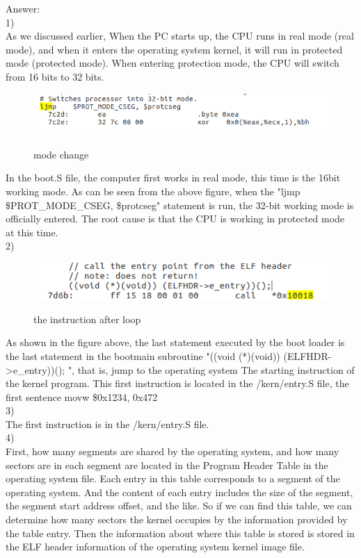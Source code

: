 \begin{flushleft}
{\Large Answer:}\\
1)\\
\qquad As we discussed earlier, When the PC starts up, the CPU runs in real mode (real mode), and when it enters the operating system kernel, it will run in protected mode (protected mode). When entering protection mode, the CPU will switch from 16 bits to 32 bits.
\begin{figure}[H]
  \centering
  \includegraphics[width=0.8\linewidth]{figure/mode_change}\\
  \caption{mode change}\label{2}
\end{figure}
\qquad In the boot.S file, the computer first works in real mode, this time is the 16bit working mode. As can be seen from the above figure, when the "ljmp \$PROT\_MODE\_CSEG, \$protcseg" statement is run, the 32-bit working mode is officially entered. The root cause is that the CPU is working in protected mode at this time.\\
2)\\
\begin{figure}[H]
  \centering
  \includegraphics[width=0.8\linewidth]{figure/7d6b}\\
  \caption{the instruction after loop}\label{2}
\end{figure}
\qquad As shown in the figure above, the last statement executed by the boot loader is the last statement in the bootmain subroutine "((void (*)(void)) (ELFHDR->e\_entry))(); ", that is, jump to the operating system The starting instruction of the kernel program.
This first instruction is located in the /kern/entry.S file, the first sentence movw \$0x1234, 0x472\\
3)\\
\qquad The first instruction is in the /kern/entry.S file.\\
4)\\
\qquad First, how many segments are shared by the operating system, and how many sectors are in each segment are located in the Program Header Table in the operating system file. Each entry in this table corresponds to a segment of the operating system. And the content of each entry includes the size of the segment, the segment start address offset, and the like. So if we can find this table, we can determine how many sectors the kernel occupies by the information provided by the table entry.
Then the information about where this table is stored is stored in the ELF header information of the operating system kernel image file.\\
\end{flushleft}


